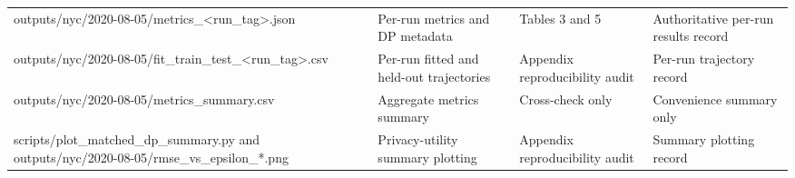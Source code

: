 \begin{table}[!htbp]
\begin{threeparttable}
\begin{tabularx}{\textwidth}{>{\raggedright\arraybackslash}p{}>{\raggedright\arraybackslash}p{}>{\raggedright\arraybackslash}p{}>{\raggedright\arraybackslash}X}
outputs/nyc/2020-08-05/metrics\_<run\_tag>.json & Per-run metrics and DP metadata & Tables 3 and 5 & Authoritative per-run results record \\
outputs/nyc/2020-08-05/fit\_train\_test\_<run\_tag>.csv & Per-run fitted and held-out trajectories & Appendix reproducibility audit & Per-run trajectory record \\
outputs/nyc/2020-08-05/metrics\_summary.csv & Aggregate metrics summary & Cross-check only & Convenience summary only \\
scripts/plot\_matched\_dp\_summary.py and outputs/nyc/2020-08-05/rmse\_vs\_epsilon\_*.png & Privacy-utility summary plotting & Appendix reproducibility audit & Summary plotting record \\
\bottomrule
\end{tabularx}
\end{threeparttable}
\end{table}
